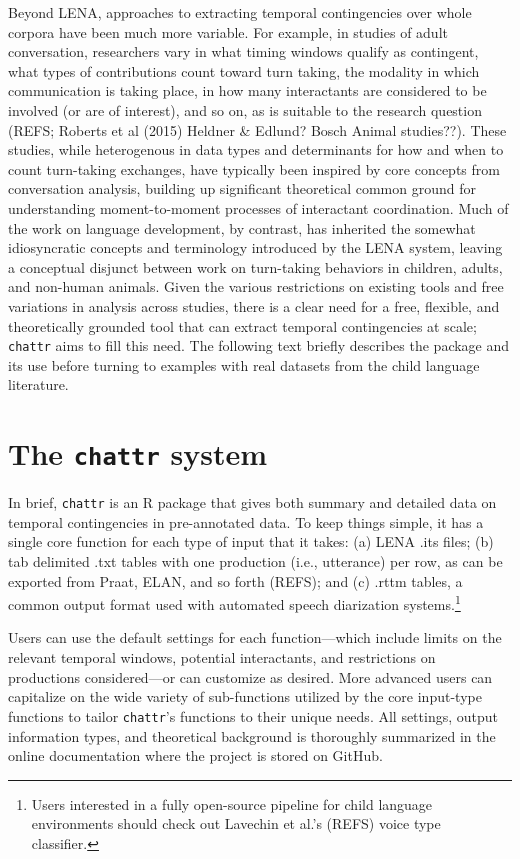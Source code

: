 \documentclass[10pt, letterpaper]{article}
\begin{document}
Beyond LENA, approaches to extracting temporal contingencies over whole
corpora have been much more variable. For example, in studies of adult
conversation, researchers vary in what timing windows qualify as
contingent, what types of contributions count toward turn taking, the
modality in which communication is taking place, in how many
interactants are considered to be involved (or are of interest), and so
on, as is suitable to the research question (REFS; Roberts et al (2015)
Heldner \& Edlund? Bosch Animal studies??). These studies, while
heterogenous in data types and determinants for how and when to count
turn-taking exchanges, have typically been inspired by core concepts
from conversation analysis, building up significant theoretical common
ground for understanding moment-to-moment processes of interactant
coordination. Much of the work on language development, by contrast, has
inherited the somewhat idiosyncratic concepts and terminology introduced
by the LENA system, leaving a conceptual disjunct between work on
turn-taking behaviors in children, adults, and non-human animals. Given
the various restrictions on existing tools and free variations in
analysis across studies, there is a clear need for a free, flexible, and
theoretically grounded tool that can extract temporal contingencies at
scale; \texttt{chattr} aims to fill this need. The following text
briefly describes the package and its use before turning to examples
with real datasets from the child language literature.

\hypertarget{the-chattr-system}{%
\section{\texorpdfstring{The \texttt{chattr}
system}{The chattr system}}\label{the-chattr-system}}

In brief, \texttt{chattr} is an R package that gives both summary and
detailed data on temporal contingencies in pre-annotated data. To keep
things simple, it has a single core function for each type of input that
it takes: (a) LENA .its files; (b) tab delimited .txt tables with one
production (i.e., utterance) per row, as can be exported from Praat,
ELAN, and so forth (REFS); and (c) .rttm tables, a common output format
used with automated speech diarization systems.\footnote{Users
  interested in a fully open-source pipeline for child language
  environments should check out Lavechin et al.'s (REFS) voice type
  classifier.}

Users can use the default settings for each function---which include
limits on the relevant temporal windows, potential interactants, and
restrictions on productions considered---or can customize as desired.
More advanced users can capitalize on the wide variety of sub-functions
utilized by the core input-type functions to tailor \texttt{chattr}'s
functions to their unique needs. All settings, output information types,
and theoretical background is thoroughly summarized in the online
documentation where the project is stored on GitHub.
\end{document}
